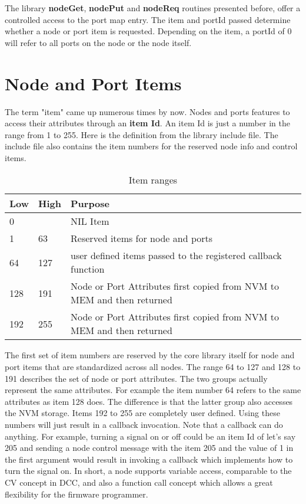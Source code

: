 The library \textbf{nodeGet}, \textbf{nodePut} and \textbf{nodeReq} routines presented before, offer a controlled access to the port map entry. The item and portId passed determine whether a node or port item is requested. Depending on the item, a portId of 0 will refer to all ports on the node or the node itself.

\section{Node and Port Items}

The term "item" came up numerous times by now. Nodes and ports features to access their attributes through an \textbf{item Id}. An item Id is just a number in the range from 1 to 255. Here is the definition from the library include file. The include file also contains the item numbers for the reserved node info and control items.

\begin{table}[h!]
    \begin{center}
        \caption{Item ranges}
        \begin{tabular}{|l|l|p{}|}
            \toprule
            \textbf{Low} & \textbf{High} & \textbf{Purpose} \\
            \midrule
            0 & & NIL Item \\
            \midrule
            1 & 63 & Reserved items for node and ports \\
            \midrule
            64 & 127 & user defined items passed to the registered callback function \\
            \midrule
            128 & 191 & Node or Port Attributes first copied from NVM to MEM and then returned \\
            \midrule
            192 & 255 & Node or Port Attributes first copied from NVM to MEM and then returned \\
            \bottomrule
        \end{tabular}
    \end{center}
\end{table}

The first set of item numbers are reserved by the core library itself for node and port items that are standardized across all nodes. The range 64 to 127 and 128 to 191 describes the set of node or port attributes. The two groups actually represent the same attributes. For example the item number 64 refers to the same attributes as item 128 does. The difference is that the latter group also accesses the NVM storage. Items 192 to 255 are completely user defined. Using these numbers will just result in a callback invocation. Note that a callback can do anything. For example, turning a signal on or off could be an item Id of let's say 205 and sending a node control message with the item 205 and the value of 1 in the first argument would result in invoking a callback which implements how to turn the signal on. In short, a node supports variable access, comparable to the CV concept in DCC, and also a function call concept which allows a great flexibility for the firmware programmer.

